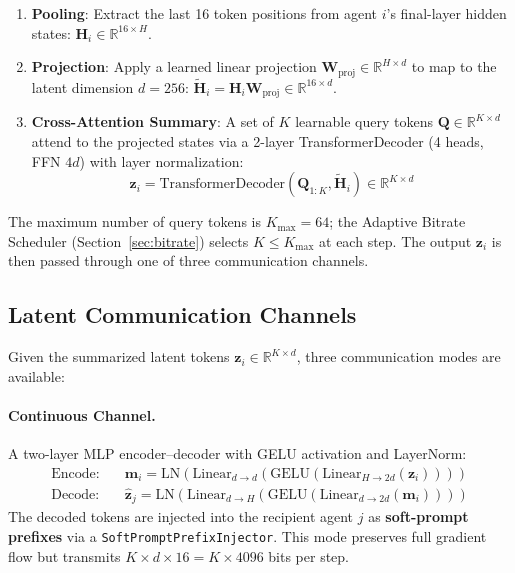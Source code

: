 \documentclass{article}
\newcommand{\RR}{\mathbb{R}}
\begin{document}
\begin{enumerate}[leftmargin=*,itemsep=1pt]
\item \textbf{Pooling}: Extract the last 16 token positions from agent $i$'s final-layer hidden states: $\mathbf{H}_i \in \RR^{16 \times H}$.
\item \textbf{Projection}: Apply a learned linear projection $\mathbf{W}_\text{proj} \in \RR^{H \times d}$ to map to the latent dimension $d{=}256$: $\tilde{\mathbf{H}}_i = \mathbf{H}_i \mathbf{W}_\text{proj} \in \RR^{16 \times d}$.
\item \textbf{Cross-Attention Summary}: A set of $K$ learnable query tokens $\mathbf{Q} \in \RR^{K \times d}$ attend to the projected states via a 2-layer TransformerDecoder (4 heads, FFN $4d$) with layer normalization:
\begin{equation}
\mathbf{z}_i = \text{TransformerDecoder}(\mathbf{Q}_{1:K}, \tilde{\mathbf{H}}_i) \in \RR^{K \times d}
\label{eq:summarizer}
\end{equation}
\end{enumerate}

The maximum number of query tokens is $K_\text{max}{=}64$; the Adaptive Bitrate Scheduler (Section~\ref{sec:bitrate}) selects $K \leq K_\text{max}$ at each step.  The output $\mathbf{z}_i$ is then passed through one of three communication channels.

\subsection{Latent Communication Channels}
\label{sec:channels}

Given the summarized latent tokens $\mathbf{z}_i \in \RR^{K \times d}$, three communication modes are available:

\paragraph{Continuous Channel.}
A two-layer MLP encoder--decoder with GELU activation and LayerNorm:
\begin{align}
\text{Encode:}\quad & \mathbf{m}_i = \text{LN}(\text{Linear}_{d \to d}(\text{GELU}(\text{Linear}_{H \to 2d}(\mathbf{z}_i)))) \label{eq:cont_enc} \\
\text{Decode:}\quad & \hat{\mathbf{z}}_j = \text{LN}(\text{Linear}_{d \to H}(\text{GELU}(\text{Linear}_{d \to 2d}(\mathbf{m}_i)))) \label{eq:cont_dec}
\end{align}
The decoded tokens are injected into the recipient agent $j$ as \textbf{soft-prompt prefixes} via a \texttt{SoftPromptPrefixInjector}.  This mode preserves full gradient flow but transmits $K \times d \times 16 = K \times 4096$ bits per step.
\end{document}
